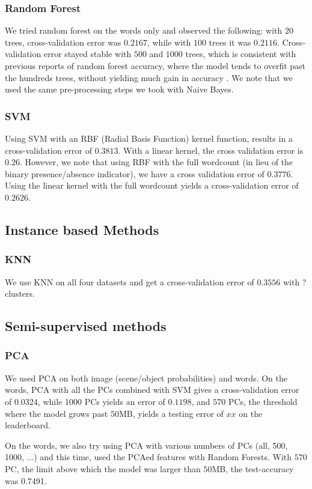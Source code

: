 \documentclass[11pt,twocolumn]{report}
\begin{document}
     \subsubsection{Random Forest}
     We tried random forest on the words only and observed the following: with $20$ trees, cross-validation error was $0.2167$, while with $100$ trees it was $0.2116$. Cross-validation error stayed stable with $500$ and $1000$ trees, which is consistent with previous reports of random forest accuracy, where the model tends to overfit past the hundreds trees, without yielding much gain in accuracy \cite{latinne2001limiting,oshiro2012many}. We note that we used the same pre-processing steps we took with Naive Bayes.

    \subsubsection{SVM}
    Using SVM with an RBF (Radial Basis Function) kernel function, results in a cross-validation error of $0.3813$. With a linear kernel, the cross validation error is $0.26$. However, we note that using RBF with the full wordcount (in lieu of the binary presence/absence indicator), we have a cross validation error of $0.3776$. Using the linear kernel with the full wordcount yields a cross-validation error of $0.2626$.
    
    \subsection*{Instance based Methods}
    \subsubsection{KNN}
    
    We use KNN on all four datasets and get a cross-validation error of $0.3556$ with ? clusters.
   
    \subsection*{Semi-supervised methods}
    \subsubsection*{PCA}
    We used PCA on both image (scene/object probabilities) and words. On the words, PCA with all the PCs combined with SVM gives a cross-validation error of $0.0324$, while 1000 PCs yields an error of $0.1198$, and $570$ PCs, the threshold where the model grows past $50$MB, yields a testing error of $xx$ on the leaderboard.
    \par
   On the words, we also try using PCA with various numbers of PCs (all, 500, 1000, ...) and this time, used the PCAed features with Random Forests. With $570$ PC, the limit above which the model was larger than $50$MB, the test-accuracy was 0.7491.\\
\end{document}
